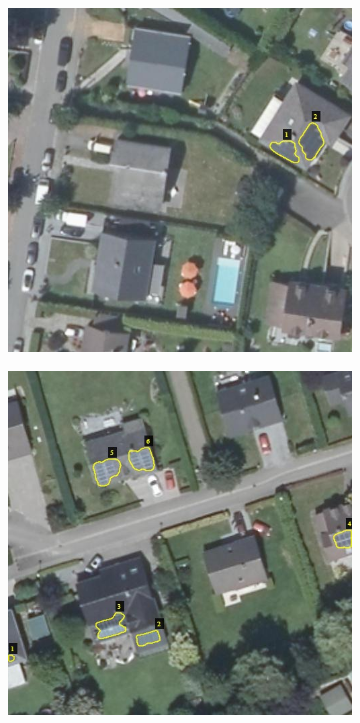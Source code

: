 \documentclass[a4paper, 12pt]{article}
\begin{document}
\begin{figure}[h]
    \centering
	\begin{subfigure}{0.31\textwidth}
		\centering
		\includegraphics[width=\textwidth]{resources/jpg/609327_533000.jpg}
		\vspace{0em}
	\end{subfigure}
	\hspace{0.5em}
	\begin{subfigure}{0.31\textwidth}
		\centering
		\includegraphics[width=\textwidth]{resources/jpg/609483_533144.jpg}

\end{subfigure}
\end{figure}
\end{document}
